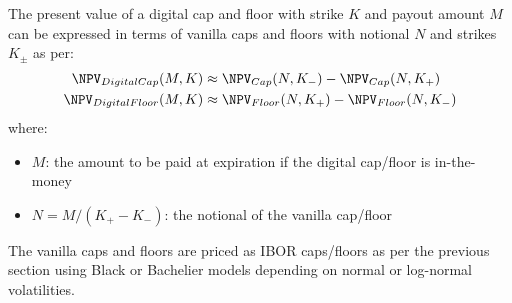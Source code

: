 \medskip
The present value of a digital cap and floor with strike $K$ and payout amount 
$M$ can be expressed in terms of vanilla caps and floors with notional $N$ and 
strikes $K_\pm$ as per:
\begin{align*}
\NPV_{DigitalCap} (M,K) &\approx \NPV_{Cap}(N,K_{-} ) - \NPV_{Cap}(N,K_{+}) \\
\NPV_{DigitalFloor} (M,K)  &\approx \NPV_{Floor} (N,K_{+} )  - \NPV_{Floor}(N,K_{-}) 
\end{align*}
where:
\begin{itemize}
\item $M$: the amount to be paid at expiration if the digital cap/floor is 
in-the-money
\item $N = M/(K_{+} - K_{-})$: the notional of the vanilla cap/floor
\end{itemize}

The vanilla caps and floors are priced as IBOR caps/floors as per the previous 
section using Black or Bachelier  models depending on normal or log-normal 
volatilities.

